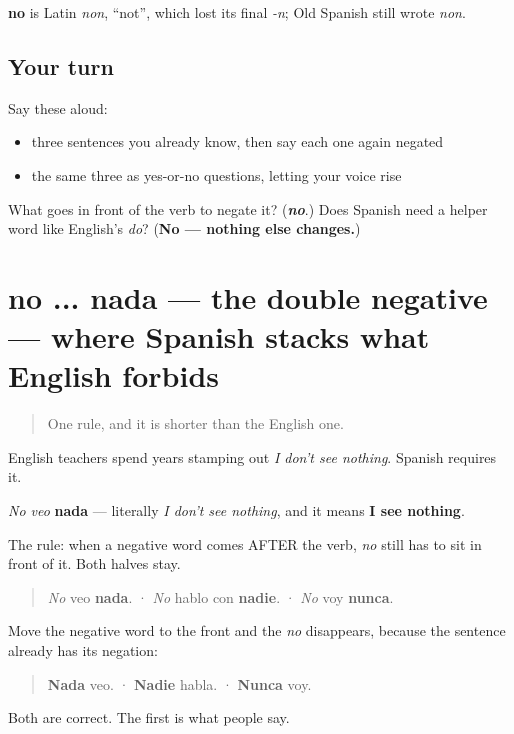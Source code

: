 \begin{cousinweb}
\textbf{no} is Latin \emph{non}, \textquotedblleft{}not\textquotedblright{}, which lost its final \emph{-n}; Old Spanish still wrote \emph{non}.
\end{cousinweb}

\subsection*{Your turn}
Say these aloud:

\begin{itemize}
\raggedright
  \item three sentences you already know, then say each one again negated
  \item the same three as yes-or-no questions, letting your voice rise
\end{itemize}

\begin{tcolorbox}[breakable,colback=teal!4,colframe=teal!35!black,title={Before you move on}]
What goes in front of the verb to negate it? (\emph{\textbf{no}}.) Does Spanish need a helper word like English's \emph{do}? (\textbf{No — nothing else changes.})
\end{tcolorbox}
\section[no ... nada]{no ... nada — the double negative — where Spanish stacks what English forbids}

\label{lesson:ES-C267-no-nada}



\begin{quote}
One rule, and it is shorter than the English one.
\end{quote}

\begin{grammarlens}[title={Grammar lens: the double negative — where Spanish stacks what English forbids}]
English teachers spend years stamping out \emph{I don't see nothing}. Spanish requires it.

\emph{No veo} \textbf{nada} — literally \emph{I don't see nothing}, and it means \textbf{I see nothing}.

The rule: when a negative word comes AFTER the verb, \emph{no} still has to sit in front of it. Both halves stay.

\begin{quote}
\emph{No} veo \textbf{nada}.  ·  \emph{No} hablo con \textbf{nadie}.  ·  \emph{No} voy \textbf{nunca}.
\end{quote}

Move the negative word to the front and the \emph{no} disappears, because the sentence already has its negation:

\begin{quote}
\textbf{Nada} veo.  ·  \textbf{Nadie} habla.  ·  \textbf{Nunca} voy.
\end{quote}

Both are correct. The first is what people say.
\end{grammarlens}

